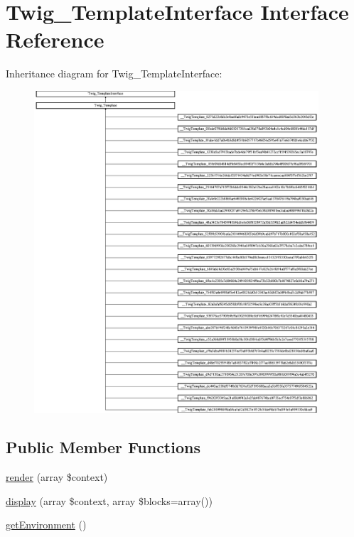 \hypertarget{interface_twig___template_interface}{}\section{Twig\+\_\+\+Template\+Interface Interface Reference}
\label{interface_twig___template_interface}
Inheritance diagram for Twig\+\_\+\+Template\+Interface\+:\begin{figure}[H]
\begin{center}
\leavevmode
\includegraphics[height=12.000000cm]{interface_twig___template_interface}
\end{center}
\end{figure}
\subsection*{Public Member Functions}
\begin{DoxyCompactItemize}
\item 
\hyperlink{interface_twig___template_interface_a09fce96a9866b9a2bcba80d611c0199c}{render} (array \$context)
\item 
\hyperlink{interface_twig___template_interface_a056b93bf930a9629d3a96234ce462f20}{display} (array \$context, array \$blocks=array())
\item 
\hyperlink{interface_twig___template_interface_a1a945689f9a90f9029d671ec32262d37}{get\+Environment} ()
\end{DoxyCompactItemize}
